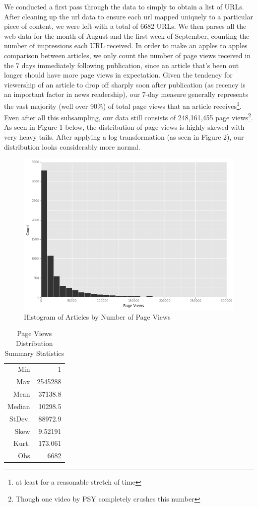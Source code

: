 \documentclass[fleqn,12pt]{SelfArx} %
\begin{document}
We conducted a first pass through the data to simply to obtain a list of URLs. After cleaning up the url data to ensure each url mapped uniquely to a particular piece of content, we were left with a total of 6682 URLs. We then parses all the web data for the month of August and the first week of September, counting the number of impressions each URL received. In order to make an apples to apples comparison between articles, we only count the number of page views received in the 7 days immediately following publication, since an article that's been out longer should have more page views in expectation. Given the tendency for viewership of an article to drop off sharply soon after publication (as recency is an important factor in news readership), our 7-day measure generally represents the vast majority (well over 90\%) of total page views that an article receives\footnote{at least for a reasonable stretch of time}. Even after all this subsampling, our data still consists of 248,161,455 page views\footnote{Though one video by PSY completely crushes this number}. As seen in Figure 1 below, the distribution of page views is highly skewed with very heavy tails. After applying a log transformation (as seen in Figure 2), our distribution looks considerably more normal. 

\begin{figure}[ht]\centering
\includegraphics[width=\linewidth]{pageviews_hist}
\caption{Histogram of Articles by Number of Page Views}
\label{fig:pv_hist}
\end{figure}
\begin{table}[hbt]
\caption{Page Views Distribution Summary Statistics}
\centering
\begin{tabular}{rr}
\toprule
Min               &  1\\
Max               &  2545288\\  
Mean              &  37138.8\\
Median            &  10298.5\\
StDev.         &  88972.9\\
Skew          &  9.52191\\
Kurt.          &  173.061\\
\midrule
Obs &  6682\\
\bottomrule
\end{tabular}
\end{table}
\end{document}
